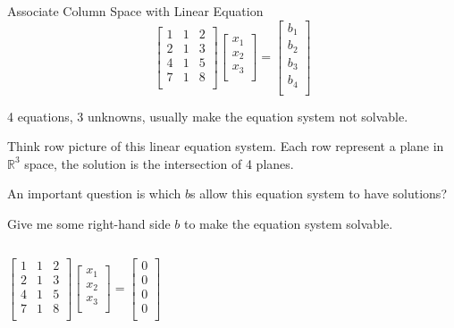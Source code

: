 \documentclass{beamer}
\begin{document}
\begin{frame}{Associate Column Space with Linear Equation}
\begin{equation*}
    \left[ \begin{matrix}
        1&		1&		2\\
        2&		1&		3\\
        4&		1&		5\\
        7&		1&		8\\
    \end{matrix} \right] \left[ \begin{array}{c}
        x_1\\
        x_2\\
        x_3\\
    \end{array} \right] =\left[ \begin{array}{c}
        b_1\\
        b_2\\
        b_3\\
        b_4\\
    \end{array} \right]
\end{equation*}

4 equations, 3 unknowns, usually make the equation system not solvable.

\vspace{3pt}
Think row picture of this linear equation system. Each row represent a plane in $\mathbb{R}^3$ space, the solution is the intersection of 4 planes.

\vspace{3pt}
An important question is which $b$s allow this equation system to have solutions?

\vspace{3pt}
Give me some right-hand side $b$ to make the equation system solvable.

\vspace{-7pt}
\begin{columns}
    \begin{equation*}
        \left[ \begin{matrix}
            1&		1&		2\\
            2&		1&		3\\
            4&		1&		5\\
            7&		1&		8\\
        \end{matrix} \right] \left[ \begin{array}{c}
            x_1\\
            x_2\\
            x_3\\
        \end{array} \right] =\left[ \begin{array}{c}
            0\\
            0\\
            0\\
            0\\
        \end{array} \right]
    \end{equation*}


\end{columns}
\end{frame}
\end{document}

